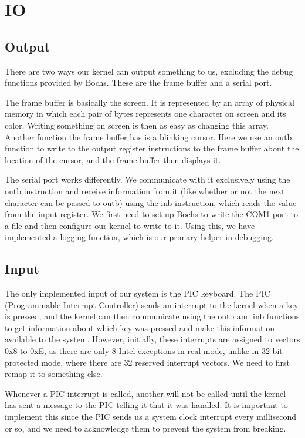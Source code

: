 \documentclass{article}
\begin{document}
\section{IO}
\subsection{Output}
There are two ways our kernel can output something to us, excluding the debug functions provided by Bochs. These are the frame buffer and a serial port.

The frame buffer is basically the screen. It is represented by an array of physical memory in which each pair of bytes represents one character on screen and its color. Writing something on screen is then as easy as changing this array. Another function the frame buffer has is a blinking cursor. Here we use an outb function to write to the output register instructions to the frame buffer about the location of the cursor, and the frame buffer then displays it.

The serial port works differently. We communicate with it exclusively using the outb instruction and receive information from it (like whether or not the next character can be passed to outb) using the inb instruction, which reads the value from the input register. We first need to set up Bochs to write the COM1 port to a file and then configure our kernel to write to it. Using this, we have implemented a logging function, which is our primary helper in debugging. 

\subsection{Input}
The only implemented input of our system is the PIC keyboard. The PIC (Programmable Interrupt Controller) sends an interrupt to the kernel when a key is pressed, and the kernel can then communicate using the outb and inb functions to get information about which key was pressed and make this information available to the system. However, initially, these interrupts are assigned to vectors 0x8 to 0xE, as there are only 8 Intel exceptions in real mode, unlike in 32-bit protected mode, where there are 32 reserved interrupt vectors. We need to first remap it to something else. 

Whenever a PIC interrupt is called, another will not be called until the kernel has sent a message to the PIC telling it that it was handled. It is important to implement this since the PIC sends us a system clock interrupt every millisecond or so, and we need to acknowledge them to prevent the system from breaking.
\end{document}
